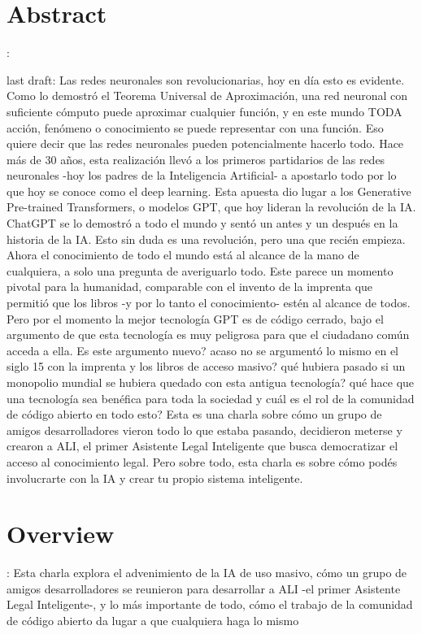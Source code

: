 
\section*{Abstract}: 

last draft: 
Las redes neuronales son revolucionarias, hoy en día esto es evidente.
Como lo demostró el Teorema Universal de Aproximación, una red neuronal con suficiente cómputo puede aproximar cualquier función, y en este mundo TODA acción, fenómeno o conocimiento se puede representar con una función. Eso quiere decir que las redes neuronales pueden potencialmente hacerlo todo.
Hace más de 30 años, esta realización llevó a los primeros partidarios de las redes neuronales -hoy los padres de la Inteligencia Artificial- a apostarlo todo por lo que hoy se conoce como el deep learning. Esta apuesta dio lugar a los Generative Pre-trained Transformers, o modelos GPT, que hoy lideran la revolución de la IA. ChatGPT se lo demostró a todo el mundo y sentó un antes y un después en la historia de la IA. Esto sin duda es una revolución, pero una que recién empieza. Ahora el conocimiento de todo el mundo está al alcance de la mano de cualquiera, a solo una pregunta de averiguarlo todo. Este parece un momento pivotal para la humanidad, comparable con el invento de la imprenta que permitió que los libros -y por lo tanto el conocimiento- estén al alcance de todos.
Pero por el momento la mejor tecnología GPT es de código cerrado, bajo el argumento de que esta tecnología es muy peligrosa para que el ciudadano común acceda a ella. Es este argumento nuevo? acaso no se argumentó lo mismo en el siglo 15 con la imprenta y los libros de acceso masivo? qué hubiera pasado si un monopolio mundial se hubiera quedado con esta antigua tecnología? qué hace que una tecnología sea benéfica para toda la sociedad y cuál es el rol de la comunidad de código abierto en todo esto?
Esta es una charla sobre cómo un grupo de amigos desarrolladores vieron todo lo que estaba pasando, decidieron meterse y crearon a ALI, el primer Asistente Legal Inteligente que busca democratizar el acceso al conocimiento legal.
Pero sobre todo, esta charla es sobre cómo podés involucrarte con la IA y crear tu propio sistema inteligente.







\section*{Overview}: 
Esta charla explora el advenimiento de la IA de uso masivo, cómo un grupo de amigos desarrolladores se reunieron para desarrollar a ALI -el primer Asistente Legal Inteligente-, y lo más importante de todo, cómo el trabajo de la comunidad de código abierto da lugar a que cualquiera haga lo mismo

